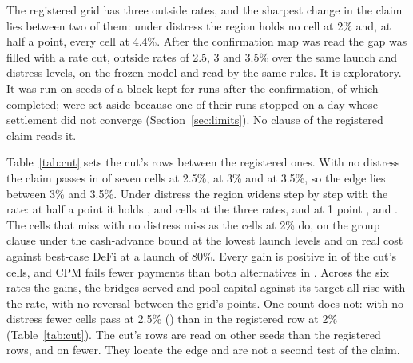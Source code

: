 The registered grid has three outside rates, and the sharpest change in the claim lies between two of them: under
distress the region holds no cell at 2\% and, at half a point, every cell at 4.4\%. After the confirmation map was
read the gap was filled with a rate cut, outside rates of 2.5, 3 and 3.5\% over the same launch and distress
levels, on the frozen model and read by the same rules. It is exploratory. It was run on \CutSeedsTried{} seeds
of a block kept for runs after the confirmation, of which \CutSeeds{} completed; \CutSeedsAside{} were set
aside because one of their \CutCells{} runs stopped on a day whose settlement did not converge
(Section~\ref{sec:limits}). No clause of the registered claim reads it.

Table~\ref{tab:cut} sets the cut's rows between the registered ones. With no distress the claim passes in
\CutPassZeroTwoFive{} of seven cells at 2.5\%, \CutPassZeroThree{} at 3\% and \CutPassZeroThreeFive{} at 3.5\%, so
the edge lies between 3\% and 3.5\%. Under distress the region widens step by step with the rate: at half a point
it holds \CutPassHalfTwoFive{}, \CutPassHalfThree{} and \CutPassHalfThreeFive{} cells at the three rates, and at 1
point \CutPassOneTwoFive{}, \CutPassOneThree{} and \CutPassOneThreeFive{}. The cells that miss with no distress
miss as the cells at 2\% do, on the group clause under the cash-advance bound at the lowest launch levels and on
real cost against best-case DeFi at a launch of 80\%. Every gain is positive in \CutGainPositive{} of the cut's
\CutCells{} cells, and CPM fails fewer payments than both alternatives in \CutFewerFailures{}. Across the six
rates the gains, the bridges served and pool capital against its target all rise with the rate, with no reversal
between the grid's points. One count does not: with no distress fewer cells pass at 2.5\% (\CutPassZeroTwoFive{}) than
in the registered row at 2\% (Table~\ref{tab:cut}). The cut's rows are read on other seeds than the registered rows, and on fewer. They
locate the edge and are not a second test of the claim.

\begin{table}[htbp]\centering\footnotesize

\caption{The claim over six outside rates, by distress level and launch participation: $\bullet$ in its map's
region, $\circ$ passing outside the largest joined block, $\times$ not passing. Rates marked $\dagger$ are the
exploratory rate cut on \CutSeeds{} seeds; the others are the registered map on \NumSeeds{} seeds.}
\label{tab:cut}
\end{table}

